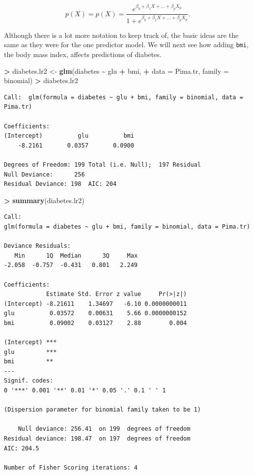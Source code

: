 \documentclass[
]{krantz}
\makeatletter
\newenvironment{Shaded}{\begin{snugshade}}{\end{snugshade}}
\newcommand{\DataTypeTok}[1]{\textcolor[rgb]{0.27,0.27,0.27}{#1}}
\newcommand{\KeywordTok}[1]{\textcolor[rgb]{0.27,0.27,0.27}{\textbf{#1}}}
\newcommand{\NormalTok}[1]{#1}
\newcommand{\OperatorTok}[1]{\textcolor[rgb]{0.43,0.43,0.43}{\textbf{#1}}}
\newcommand{\StringTok}[1]{\textcolor[rgb]{0.5,0.5,0.5}{#1}}
\newenvironment{kframe}{%
\medskip{}
\setlength{\fboxsep}{.8em}
 \def\at@end@of@kframe{}%
 \ifinner\ifhmode%
  \def\at@end@of@kframe{\end{minipage}}%
  \begin{minipage}{\columnwidth}%
 \fi\fi%
 \def\FrameCommand##1{\hskip\@totalleftmargin \hskip-\fboxsep
 \colorbox{shadecolor}{##1}\hskip-\fboxsep
     \hskip-\linewidth \hskip-\@totalleftmargin \hskip\columnwidth}%
 \MakeFramed {\advance\hsize-\width
   \@totalleftmargin\z@ \linewidth\hsize
   \@setminipage}}%
 {\par\unskip\endMakeFramed%
 \at@end@of@kframe}
\renewenvironment{Shaded}{\begin{kframe}}{\end{kframe}}
\makeatother
\begin{document}
\[
p(X) = p(X) = \frac{e^{\beta_0 + \beta_1 X + \dots + \beta_p X_p}}{1 + e^{\beta_0 + \beta_1 X + \dots + \beta_p X_p}}.
\]

Although there is a lot more notation to keep track of, the basic ideas are the same as they were for the one predictor model. We will next see how adding \texttt{bmi}, the body mass index, affects predictions of diabetes.

\begin{Shaded}
\begin{Highlighting}[]
\OperatorTok{\textgreater{}}\StringTok{ }\NormalTok{diabetes.lr2 \textless{}{-}}\StringTok{ }\KeywordTok{glm}\NormalTok{(diabetes }\OperatorTok{\textasciitilde{}}\StringTok{ }\NormalTok{glu }\OperatorTok{+}\StringTok{ }\NormalTok{bmi, }
\OperatorTok{+}\StringTok{                     }\DataTypeTok{data =}\NormalTok{ Pima.tr, }\DataTypeTok{family =}\NormalTok{ binomial)}
\OperatorTok{\textgreater{}}\StringTok{ }\NormalTok{diabetes.lr2}
\end{Highlighting}
\end{Shaded}

\begin{verbatim}
Call:  glm(formula = diabetes ~ glu + bmi, family = binomial, data = Pima.tr)

Coefficients:
(Intercept)          glu          bmi  
    -8.2161       0.0357       0.0900  

Degrees of Freedom: 199 Total (i.e. Null);  197 Residual
Null Deviance:      256 
Residual Deviance: 198  AIC: 204
\end{verbatim}

\begin{Shaded}
\begin{Highlighting}[]
\OperatorTok{\textgreater{}}\StringTok{ }\KeywordTok{summary}\NormalTok{(diabetes.lr2)}
\end{Highlighting}
\end{Shaded}

\begin{verbatim}
Call:
glm(formula = diabetes ~ glu + bmi, family = binomial, data = Pima.tr)

Deviance Residuals: 
   Min      1Q  Median      3Q     Max  
-2.058  -0.757  -0.431   0.801   2.249  

Coefficients:
            Estimate Std. Error z value     Pr(>|z|)
(Intercept) -8.21611    1.34697   -6.10 0.0000000011
glu          0.03572    0.00631    5.66 0.0000000152
bmi          0.09002    0.03127    2.88        0.004
               
(Intercept) ***
glu         ***
bmi         ** 
---
Signif. codes:  
0 '***' 0.001 '**' 0.01 '*' 0.05 '.' 0.1 ' ' 1

(Dispersion parameter for binomial family taken to be 1)

    Null deviance: 256.41  on 199  degrees of freedom
Residual deviance: 198.47  on 197  degrees of freedom
AIC: 204.5

Number of Fisher Scoring iterations: 4
\end{verbatim}
\end{document}
